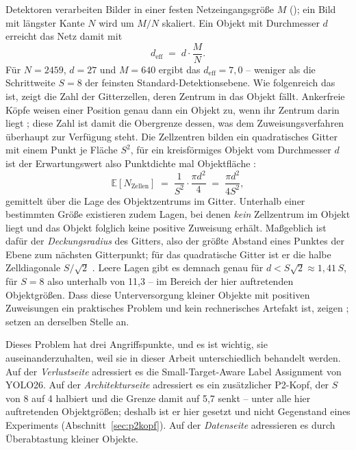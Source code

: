 Detektoren verarbeiten Bilder in einer festen Netzeingangsgröße $M$
(); ein Bild mit längster Kante $N$ wird um $M/N$ skaliert. Ein
Objekt mit Durchmesser $d$ erreicht das Netz damit mit
\begin{equation}
d_{\text{eff}} \;=\; d \cdot \frac{M}{N} .
\label{eq:deff}
\end{equation}
Für $N = 2459$, $d = 27$\px{} und $M = 640$ ergibt das
$d_{\text{eff}} = 7{,}0$\px{} -- weniger als die Schrittweite $S = 8$ der
feinsten Standard-Detektionsebene. Wie folgenreich das ist, zeigt die Zahl der
Gitterzellen, deren Zentrum in das Objekt fällt. Ankerfreie Köpfe weisen einer
Position genau dann ein Objekt zu, wenn ihr Zentrum darin liegt
\parencite{tian2019fcos}; diese Zahl ist damit die Obergrenze dessen, was dem
Zuweisungsverfahren überhaupt zur Verfügung steht. Die Zellzentren bilden ein
quadratisches Gitter mit einem Punkt je Fläche $S^2$, für ein kreisförmiges
Objekt vom Durchmesser $d$ ist der Erwartungswert also Punktdichte mal
Objektfläche \parencite[vgl.][]{santalo2004}:
\begin{equation}
\mathbb{E}[N_{\text{Zellen}}] \;=\; \frac{1}{S^2} \cdot \frac{\pi d^2}{4}
\;=\; \frac{\pi d^2}{4 S^2} ,
\label{eq:zellen}
\end{equation}
gemittelt über die Lage des Objektzentrums im Gitter. Unterhalb einer bestimmten
Größe existieren zudem Lagen, bei denen \emph{kein} Zellzentrum im Objekt liegt
und das Objekt folglich keine positive Zuweisung erhält. Maßgeblich ist dafür der
\emph{Deckungsradius} des Gitters, also der größte Abstand eines Punktes der
Ebene zum nächsten Gitterpunkt; für das quadratische Gitter ist er die halbe
Zelldiagonale $S/\sqrt{2}$ \parencite[Kap.~2]{conway1999}. Leere Lagen gibt es
demnach genau für $d < S\sqrt{2} \approx 1{,}41\,S$, für $S = 8$ also unterhalb
von 11,3\px{} -- im Bereich der hier auftretenden Objektgrößen. Dass diese
Unterversorgung kleiner Objekte mit positiven Zuweisungen ein praktisches
Problem und kein rechnerisches Artefakt ist, zeigen
\textcite{xu2022rfla}; \textcite{zhang2020atss} setzen an derselben Stelle an.

Dieses Problem hat drei Angriffspunkte, und es ist wichtig, sie
auseinanderzuhalten, weil sie in dieser Arbeit unterschiedlich behandelt werden.
Auf der \emph{Verlustseite} adressiert es die Small-Target-Aware Label Assignment
von YOLO26. Auf der \emph{Architekturseite} adressiert es ein zusätzlicher
P2-Kopf, der $S$ von 8 auf 4 halbiert und die Grenze damit auf 5,7\px{} senkt --
unter alle hier auftretenden Objektgrößen; deshalb ist er hier gesetzt und nicht
Gegenstand eines Experiments (Abschnitt~\ref{sec:p2kopf}). Auf der
\emph{Datenseite} adressieren es \textcite{kisantal2019} durch Überabtastung
kleiner Objekte.

